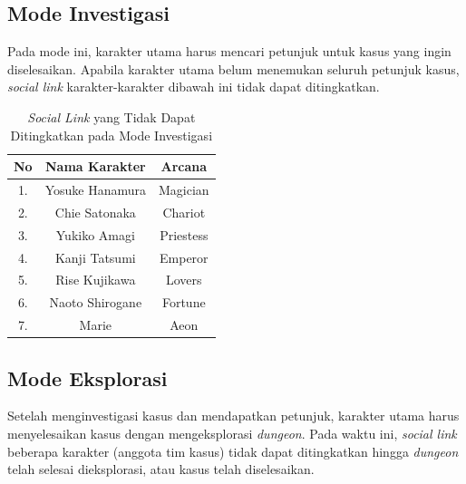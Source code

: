 \subsection{Mode Investigasi}
Pada mode ini, karakter utama harus mencari petunjuk untuk kasus yang ingin diselesaikan. Apabila karakter utama belum menemukan seluruh petunjuk kasus, \textit{social link} karakter-karakter dibawah ini tidak dapat ditingkatkan.
\begin{table}[htb]
    \caption{\label{investigationmode}\textit{Social Link} yang Tidak Dapat Ditingkatkan pada Mode Investigasi}
    \begin{center}
        \begin{tabular}{ | c | c | c |}
            \hline
            \textbf{No} & \textbf{Nama Karakter} & \textbf{Arcana} \\
            \hline
            1.          & Yosuke Hanamura        & Magician        \\
            \hline
            2.          & Chie Satonaka          & Chariot         \\
            \hline
            3.          & Yukiko Amagi           & Priestess       \\
            \hline
            4.          & Kanji Tatsumi          & Emperor         \\
            \hline
            5.          & Rise Kujikawa          & Lovers          \\
            \hline
            6.          & Naoto Shirogane        & Fortune         \\
            \hline
            7.          & Marie                  & Aeon            \\
            \hline
        \end{tabular}
    \end{center}
\end{table}


\subsection{Mode Eksplorasi}
Setelah menginvestigasi kasus dan mendapatkan petunjuk, karakter utama harus menyelesaikan kasus dengan mengeksplorasi \textit{dungeon}. Pada waktu ini, \textit{social link} beberapa karakter (anggota tim kasus) tidak dapat ditingkatkan hingga \textit{dungeon} telah selesai dieksplorasi, atau kasus telah diselesaikan.


